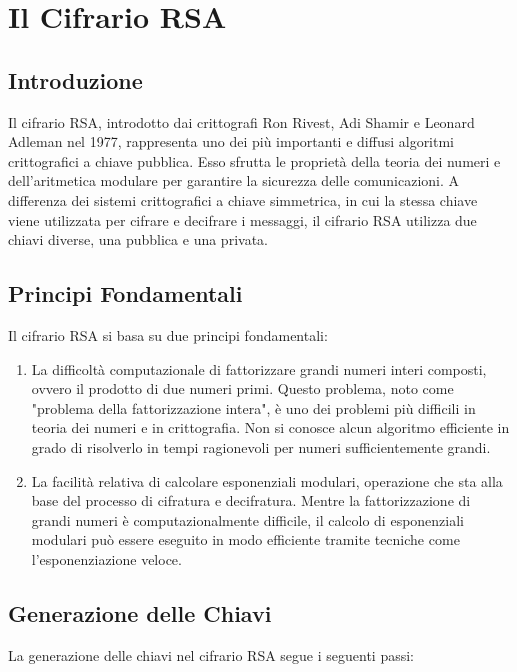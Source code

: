 \documentclass[a4paper,12pt]{report}
\begin{document}
\chapter{Il Cifrario RSA}

\section{Introduzione}
Il cifrario RSA, introdotto dai crittografi Ron Rivest, Adi Shamir e Leonard Adleman nel 1977, rappresenta uno dei più importanti e diffusi algoritmi crittografici a chiave pubblica. Esso sfrutta le proprietà della teoria dei numeri e dell'aritmetica modulare per garantire la sicurezza delle comunicazioni. A differenza dei sistemi crittografici a chiave simmetrica, in cui la stessa chiave viene utilizzata per cifrare e decifrare i messaggi, il cifrario RSA utilizza due chiavi diverse, una pubblica e una privata.

\section{Principi Fondamentali}
Il cifrario RSA si basa su due principi fondamentali:

\begin{enumerate}
    \item La difficoltà computazionale di fattorizzare grandi numeri interi composti, ovvero il prodotto di due numeri primi. Questo problema, noto come "problema della fattorizzazione intera", è uno dei problemi più difficili in teoria dei numeri e in crittografia. Non si conosce alcun algoritmo efficiente in grado di risolverlo in tempi ragionevoli per numeri sufficientemente grandi.
    \item La facilità relativa di calcolare esponenziali modulari, operazione che sta alla base del processo di cifratura e decifratura. Mentre la fattorizzazione di grandi numeri è computazionalmente difficile, il calcolo di esponenziali modulari può essere eseguito in modo efficiente tramite tecniche come l'esponenziazione veloce.
\end{enumerate}

\section{Generazione delle Chiavi}
La generazione delle chiavi nel cifrario RSA segue i seguenti passi:
\end{document}
